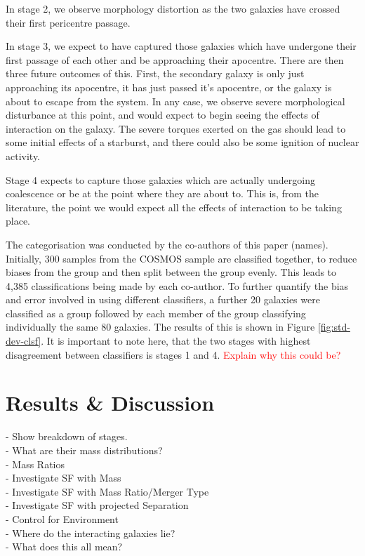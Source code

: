 \documentclass[fleqn,usenatbib]{mnras}
\begin{document}
In stage 2, we observe morphology distortion as the two galaxies have crossed their first pericentre passage.

In stage 3, we expect to have captured those galaxies which have undergone their first passage of each other and be approaching their apocentre. There are then three future outcomes of this. First, the secondary galaxy is only just approaching its apocentre, it has just passed it's apocentre, or the galaxy is about to escape from the system. In any case, we observe severe morphological disturbance at this point, and would expect to begin seeing the effects of interaction on the galaxy. The severe torques exerted on the gas should lead to some initial effects of a starburst, and there could also be some ignition of nuclear activity.

Stage 4 expects to capture those galaxies which are actually undergoing coalescence or be at the point where they are about to. This is, from the literature, the point we would expect all the effects of interaction to be taking place. 

The categorisation was conducted by the co-authors of this paper (names). Initially, 300 samples from the COSMOS sample are classified together, to reduce biases from the group and then split between the group evenly. This leads to 4,385 classifications being made by each co-author. To further quantify the bias and error involved in using different classifiers, a further 20 galaxies were classified as a group followed by each member of the group classifying individually the same 80 galaxies. The results of this is shown in Figure \ref{fig:std-dev-clsf}. It is important to note here, that the two stages with highest disagreement between classifiers is stages 1 and 4. \textcolor{red}{Explain why this could be?}

\section{Results \& Discussion}\label{results}
 - Show breakdown of stages. \\
 - What are their mass distributions? \\
 - Mass Ratios \\
 - Investigate SF with Mass \\
 - Investigate SF with Mass Ratio/Merger Type \\
 - Investigate SF with projected Separation \\
 - Control for Environment \\
 - Where do the interacting galaxies lie? \\
 - What does this all mean?
 
\end{document}

